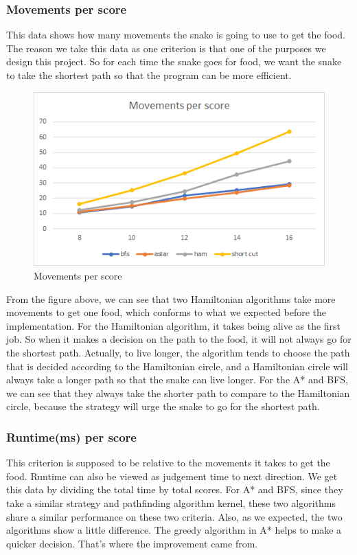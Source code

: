 \documentclass[12pt]{article}
\begin{document}
\subsubsection{Movements per score}
This data shows how many movements the snake is going to use to get the food. The reason we take this data as one criterion is that one of the purposes we design this project. So for each time the snake goes for food, we want the snake to take the shortest path so that the program can be more efficient. 

\begin{figure}[H]
    \centering 
    \includegraphics[scale = 0.9]{anay1.png}
    \caption{Movements per score}
\end{figure}

From the figure above, we can see that two Hamiltonian algorithms take more movements to get one food, which conforms to what we expected before the implementation. For the Hamiltonian algorithm, it takes being alive as the first job. So when it makes a decision on the path to the food, it will not always go for the shortest path. Actually, to live longer, the algorithm tends to choose the path that is decided according to the Hamiltonian circle, and a Hamiltonian circle will always take a longer path so that the snake can live longer. For the A* and BFS, we can see that they always take the shorter path to compare to the Hamiltonian circle, because the strategy will urge the snake to go for the shortest path. 

\subsubsection{Runtime(ms) per score}

This criterion is supposed to be relative to the movements it takes to get the food. Runtime can also be viewed as judgement time to next direction. We get this data by dividing the total time by total scores. For A* and BFS, since they take a similar strategy and pathfinding algorithm kernel, these two algorithms share a similar performance on these two criteria. Also, as we expected, the two algorithms show a little difference. The greedy algorithm in A* helps to make a quicker decision. That's where the improvement came from. 
\end{document}

